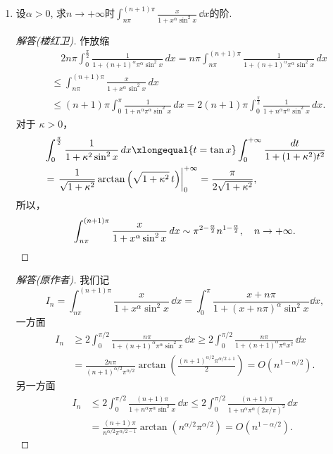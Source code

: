 \begin{b}
\begin{enumerate}
\item 设\(\alpha>0\), 求\(n\rightarrow+\infty\)时\(\int_{n\pi}^{(n+1)\pi}\frac{x}{1+x^\alpha\sin^2x}\,\dd x\)的阶.
\begin{proof}[解答(楼红卫)]作放缩
\begin{align*}
& \quad 2n\pi \int_0^{\frac{\pi}{2}} \frac{1}{1+(n+1)^\alpha \pi^\alpha \sin^2 x} \, d x
=n\pi \int_{n\pi}^{(n+1)\pi} \frac{1}{1+(n+1)^\alpha \pi^\alpha \sin ^2 x} \, d x \\
& \leqslant \int_{n\pi}^{(n+1)\pi} \frac{x}{1+x^\alpha \sin^2 x} \, d x \\
& \leqslant (n+1)\pi \int_0^\pi \frac{1}{1+n^\alpha \pi^\alpha \sin^2 x} \, d x
=2(n+1)\pi \int_0^{\frac{\pi}{2}} \frac{1}{1+n^\alpha \pi^\alpha \sin ^2 x} \, d x.
\end{align*}
对于 $\kappa>0$，
\begin{align*}
& \int_0^{\frac{\pi}{2}} \frac{1}{1+\kappa^2 \sin^2 x} \, d x 
\xlongequal{t=\tan x} \int_0^{+\infty} \frac{d t}{1+(1+\kappa^2) t^2} \\
& = \left.\frac{1}{\sqrt{1+\kappa^2}} \arctan \left(\sqrt{1+\kappa^2}\,t\right)\right|_0 ^{+\infty}
=\frac{\pi}{2\sqrt{1+\kappa^2}},
\end{align*}
所以，
\[\int_{n\pi}^{(n+1)\pi} \frac{x}{1+x^\alpha \sin^2 x} \, d x 
\sim \pi^{2-\frac{\alpha}{2}} n^{1-\frac{\alpha}{2}}, \quad n \rightarrow+\infty.\qedhere\]
\end{proof}
\begin{proof}[解答(原作者)]
我们记\[I_n=\int_{n\pi}^{(n+1)\pi}\frac{x}{1+x^\alpha\sin^2x}\,\dd x
=\int_{0}^{\pi}\frac{x+n\pi}{1+(x+n\pi)^\alpha\sin^2x}\dd x,\]
一方面\[\begin{split}
I_n&\geqslant 2\int_{0}^{\pi/2}\frac{n\pi}{1+(n+1)^\alpha\pi^\alpha\sin^2x}\,\dd x
\geqslant 2\int_{0}^{\pi/2}\frac{n\pi}{1+(n+1)^\alpha\pi^\alpha x^2}\,\dd x\\
&=\frac{2n\pi}{(n+1)^{\alpha/2}\pi^{\alpha/2}}\arctan\left(\frac{(n+1)^{\alpha/2}\pi^{\alpha/2+1}}{2}\right)=O(n^{1-\alpha/2}).
\end{split}\]另一方面\[\begin{split}
I_n&\leqslant 2\int_{0}^{\pi/2}\frac{(n+1)\pi}{1+n^\alpha\pi^{\alpha}\sin^2x}\,\dd x
\leqslant 2\int_{0}^{\pi/2}\frac{(n+1)\pi}{1+n^{\alpha}\pi^{\alpha}(2x/\pi)^2}\,\dd x\\
&=\frac{(n+1)\pi}{n^{\alpha/2}\pi^{\alpha/2-1}}\arctan(n^{\alpha/2}\pi^{\alpha/2})=O(n^{1-\alpha/2}).\end{split}\]

\end{proof}
\end{enumerate}
\end{b}
